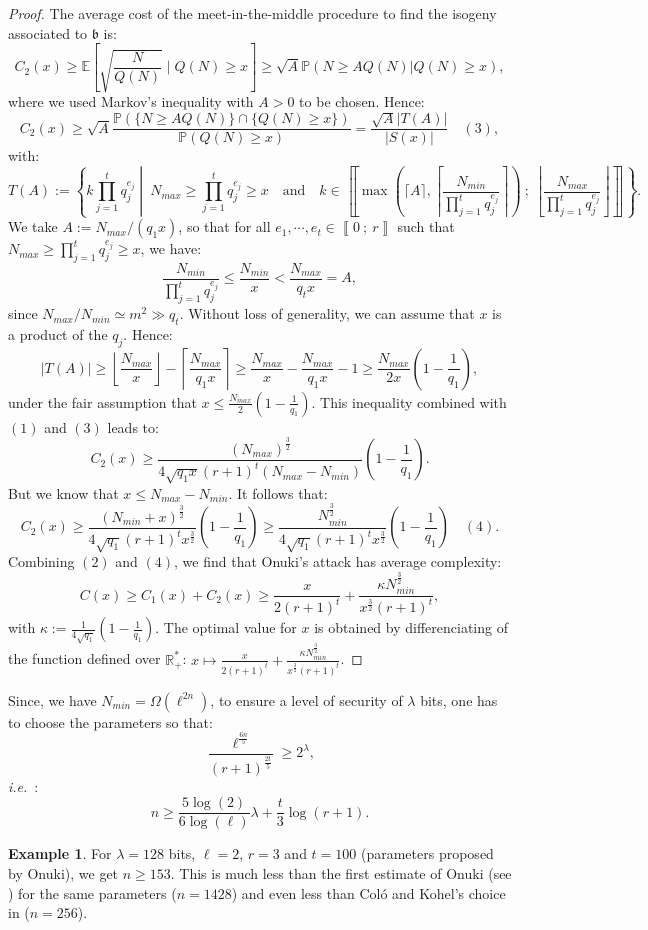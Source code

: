 \documentclass[a4paper,10pt]{report}
\theoremstyle{definition}
\theoremstyle{plain}
\theoremstyle{definition}
\newtheorem{Example}[Definition]{Example}
\newcommand{\ie}{\emph{i.e.}\ }
\newcommand{\R}{\mathbb{R}}
\newcommand{\E}{\mathbb{E}}
\renewcommand{\i}[2]{\left\llbracket #1~;~#2\right\rrbracket}
\renewcommand{\(}{\left(}
\renewcommand{\)}{\right)}
\renewcommand{\P}{\mathbb{P}}
\newcommand{\mf}[1]{\mathfrak{#1}}
\begin{document}
\begin{proof}
The average cost of the meet-in-the-middle procedure to find the isogeny associated to $\mf{b}$ is:
\[C_2(x)\geq \E\left[\sqrt{\frac{N}{Q(N)}}\mid Q(N)\geq x\right]\geq \sqrt{A}\P(N\geq A Q(N)|Q(N)\geq x),\]
where we used Markov's inequality with $A>0$ to be chosen. Hence:
\[C_2(x)\geq  \sqrt{A}\frac{\P(\{N\geq A Q(N)\}\cap\{Q(N)\geq x\})}{\P(Q(N)\geq x)}=\frac{\sqrt{A}|T(A)|}{|S(x)|} \quad (3),\]
with:
\[T(A):=\left\{k\prod_{j=1}^tq_j^{e_j}\middle| \ N_{max}\geq\prod_{j=1}^tq_j^{e_j}\geq x \quad \mbox{and} \quad k\in\i{\max\(\lceil A\rceil,\left\lceil\frac{N_{min}}{\prod_{j=1}^t q_j^{e_j}}\right\rceil\)}{\left\lfloor\frac{N_{max}}{\prod_{j=1}^t q_j^{e_j}}\right\rfloor}\right\}.\]
We take $A:=N_{max}/(q_1 x)$, so that for all $e_1, \cdots,e_t\in\i{0}{r}$ such that $N_{max}\geq \prod_{j=1}^tq_j^{e_j}\geq x$, we have:
\[\frac{N_{min}}{\prod_{j=1}^tq_j^{e_j}}\leq \frac{N_{min}}{x}<\frac{N_{max}}{q_tx}=A,\]
since $N_{max}/N_{min}\simeq m^2\gg q_t$. Without loss of generality, we can assume that $x$ is a product of the $q_j$. Hence:
\[|T(A)|\geq\left\lfloor\frac{N_{max}}{x}\right\rfloor-\left\lceil\frac{N_{max}}{q_1x}\right\rceil\geq \frac{N_{max}}{x}-\frac{N_{max}}{q_1x}-1\geq\frac{N_{max}}{2x}\(1-\frac{1}{q_1}\),\]
under the fair assumption that $x\leq \frac{N_{max}}{2}\(1-\frac{1}{q_1}\)$. This inequality combined with $(1)$ and $(3)$ leads to:
\[C_2(x)\geq \frac{(N_{max})^{\frac{3}{2}}}{4\sqrt{q_1 x}(r+1)^t(N_{max}-N_{min})}\(1-\frac{1}{q_1}\).\]
But we know that $x\leq N_{max}-N_{min}$. It follows that:
\[C_2(x)\geq  \frac{(N_{min}+x)^{\frac{3}{2}}}{4\sqrt{q_1}(r+1)^tx^{\frac{3}{2}}}\(1-\frac{1}{q_1}\)\geq \frac{N_{min}^{\frac{3}{2}}}{4\sqrt{q_1}(r+1)^tx^{\frac{3}{2}}}\(1-\frac{1}{q_1}\)\quad (4).\]
Combining $(2)$ and $(4)$, we find that Onuki's attack has average complexity:
\[C(x)\geq C_1(x)+C_2(x)\geq  \frac{x}{2(r+1)^t}+\frac{\kappa N_{min}^{\frac{3}{2}}}{x^{\frac{3}{2}}(r+1)^t},\]
with $\kappa:=\frac{1}{4\sqrt{q_1}}\(1-\frac{1}{q_1}\)$. The optimal value for $x$ is obtained by differenciating of the function defined over $\R_+^*$:  $x\longmapsto \frac{x}{2(r+1)^t}+\frac{\kappa N_{min}^{\frac{3}{2}}}{x^{\frac{3}{2}}(r+1)^t}$.
\end{proof}

Since, we have $N_{min}=\Omega(\ell^{2n})$, to ensure a level of security of $\lambda$ bits, one has to choose the parameters so that:
\[\frac{\ell^{\frac{6n}{5}}}{(r+1)^{\frac{2t}{5}}}\geq 2^\lambda,\]
\ie:
\[n\geq \frac{5\log(2)}{6\log(\ell)}\lambda+\frac{t}{3}\log(r+1).\]

\begin{Example}
For $\lambda=128$ bits, $\ell=2$, $r=3$ and $t=100$ (parameters proposed by Onuki), we get $n\geq 153$. This is much less than the first estimate of Onuki (see \cite[§ 6.3]{Onuki}) for the same parameters ($n=1428$) and even less than Col\'{o} and Kohel's choice in \cite[section 6]{OSIDH} ($n=256$).
\end{Example}
\end{document}
